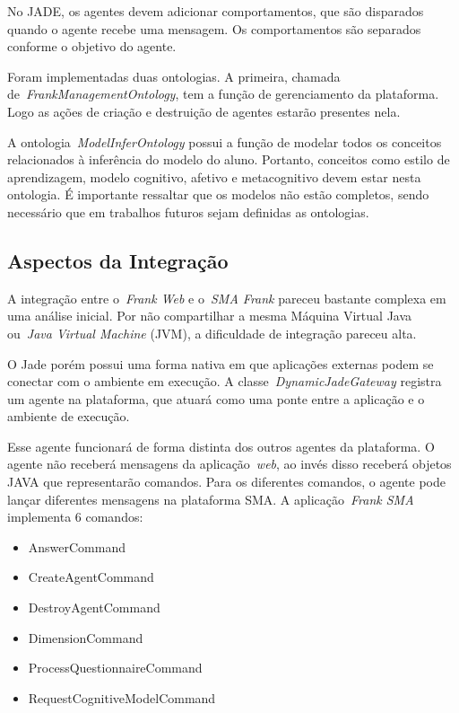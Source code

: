 No JADE, os agentes devem adicionar comportamentos, que são disparados quando o agente recebe uma mensagem. Os comportamentos são separados conforme o objetivo do agente.

Foram implementadas duas ontologias. A primeira, chamada de~\emph{FrankManagementOntology}, tem a função de gerenciamento da plataforma. Logo as ações de criação e destruição de agentes estarão presentes nela.

A ontologia~\emph{ModelInferOntology} possui a função de modelar todos os conceitos relacionados à inferência do modelo do aluno. Portanto, conceitos como estilo de aprendizagem, modelo cognitivo, afetivo e metacognitivo devem estar nesta ontologia. É importante ressaltar que os modelos não estão completos, sendo necessário que em trabalhos futuros sejam definidas as ontologias.

\subsection{Aspectos da Integração}

A integração entre o~\emph{Frank Web} e o~\emph{SMA Frank} pareceu bastante complexa em uma análise inicial. Por não compartilhar a mesma Máquina Virtual Java ou~\emph{Java Virtual Machine} (JVM), a dificuldade de integração pareceu alta.

O Jade porém possui uma forma nativa em que aplicações externas podem se conectar com o ambiente em execução. A classe~\emph{DynamicJadeGateway} registra um agente na plataforma, que atuará como uma ponte entre a aplicação e o ambiente de execução.

Esse agente funcionará de forma distinta dos outros agentes da plataforma. O agente não receberá mensagens da aplicação~\emph{web}, ao invés disso receberá objetos JAVA que representarão comandos. Para os diferentes comandos, o agente pode lançar diferentes mensagens na plataforma SMA. A aplicação~\emph{Frank SMA} implementa 6 comandos:

\begin{itemize}
	\item AnswerCommand
	\item CreateAgentCommand
	\item DestroyAgentCommand
	\item DimensionCommand
	\item ProcessQuestionnaireCommand
	\item RequestCognitiveModelCommand
\end{itemize}

